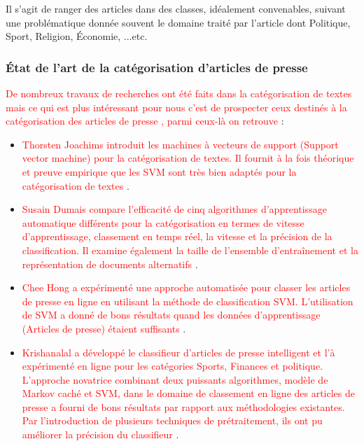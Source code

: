     Il s'agit de ranger des articles dans des classes, idéalement convenables, suivant une problématique donnée souvent le domaine traité par l'article dont Politique, Sport, Religion, Économie, ...etc.

    \subsubsection{État de l'art de la catégorisation d'articles de presse}
    
      \textcolor{red}{De nombreux travaux de recherches ont été faits dans la catégorisation de textes mais ce qui est plus intéressant pour nous c'est de prospecter ceux destinés à la catégorisation des articles de presse \cite{itemetat0}, parmi ceux-là on retrouve} :
     
     \begin{itemize}
     	
     \item  \textcolor{red}{Thorsten Joachims introduit les machines à vecteurs de support (Support vector machine) pour la catégorisation de textes. Il fournit à la fois théorique et preuve empirique que les SVM sont très bien adaptés pour la catégorisation de textes \cite{itemetat1}}. 
     
     \item  \textcolor{red}{Susain Dumais compare l'efficacité de cinq algorithmes d'apprentissage automatique différents pour la catégorisation en termes de vitesse d'apprentissage, classement en temps réel, la vitesse et la précision de la classification. Il examine également la taille de l'ensemble d'entraînement et la représentation de documents alternatifs \cite{itemetat2}}.
     
     \item  \textcolor{red}{Chee Hong a expérimenté une approche automatisée pour classer les articles de presse en ligne en utilisant la méthode de classification SVM. L'utilisation de SVM a donné de bons résultats quand les données d'apprentissage (Articles de presse) étaient suffisants \cite{itemetat3}}.
      
     \item  \textcolor{red}{Krishanalal a développé le classifieur d'articles de presse intelligent et l'à expérimenté en ligne pour les catégories Sports, Finances et politique. L'approche novatrice combinant deux puissants algorithmes, modèle de Markov caché et SVM, dans le domaine de classement en ligne des articles de presse a fourni de bons résultats par rapport aux méthodologies existantes. Par l'introduction de plusieurs techniques de prétraitement, ils ont pu améliorer la précision du classifieur \cite{itemetat6}}.
     

\end{itemize}
